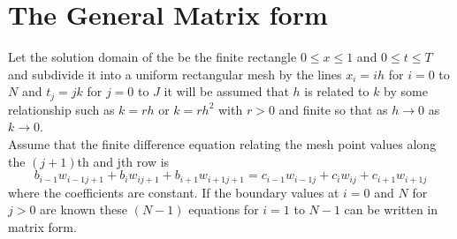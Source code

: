 \section{The General Matrix form}
Let the solution domain of the  be the finite rectangle $0\leq x \leq 1$ and
$0\leq t \leq T$ and subdivide it into a uniform rectangular mesh by the lines
$x_i=ih$ for $i=0$ to $N$ and $t_{j}=jk$ for $j=0$ to $J$ it will be assumed that $h$ is related to $k$ by some relationship such as $k=rh$ or $k=rh^2$ with $r>0$ and finite so that as $h\rightarrow 0$ as $k \rightarrow 0$.\\
Assume that the finite difference equation relating the mesh point values along the $(j+1)$th and jth row is 
\[b_{i-1}w_{i-1j+1}+
b_{i}w_{ij+1}+
b_{i+1}w_{i+1j+1}
=
c_{i-1}w_{i-1j}+
c_{i}w_{ij}+
c_{i+1}w_{i+1j}\]
where the coefficients are constant. If the boundary values at $i=0$ and $N$ for $j>0$ are known these $(N-1)$ equations for $i=1$ to $N-1$ can be written in 
matrix form.
